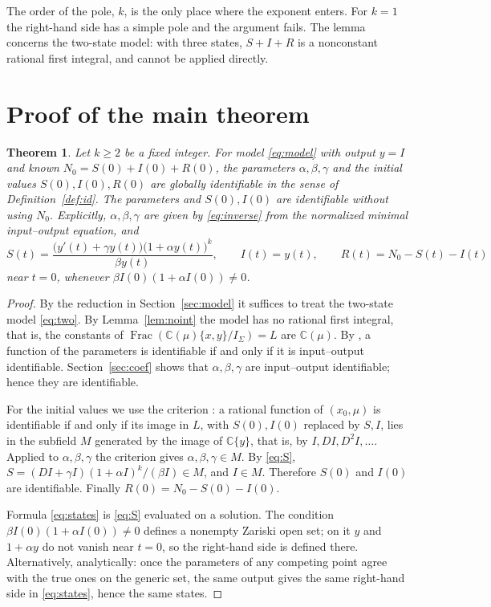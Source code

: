 \documentclass[10pt,a4paper]{article}
\newtheorem{theorem}{Theorem}
\theoremstyle{definition}
\theoremstyle{remark}
\newcommand{\C}{\mathbb C}
\begin{document}
The order of the pole, $k$, is the only place where the exponent enters.
For $k=1$ the right-hand side has a simple pole and the argument fails.
The lemma concerns the two-state model: with three states, $S+I+R$ is a
nonconstant rational first integral, and \cite[Theorem~4.7]{OPT} cannot
be applied directly.

\section{Proof of the main theorem}
\label{sec:proof}
\begin{theorem}
\label{thm:main}
Let $k\geq2$ be a fixed integer. For model \eqref{eq:model} with output
$y=I$ and known $N_0=S(0)+I(0)+R(0)$, the parameters $\alpha,\beta,\gamma$
and the initial values $S(0),I(0),R(0)$ are globally identifiable in the
sense of Definition~\ref{def:id}. The parameters and $S(0),I(0)$ are
identifiable without using $N_0$. Explicitly, $\alpha,\beta,\gamma$ are
given by \eqref{eq:inverse} from the normalized minimal input--output
equation, and
\begin{equation}
 S(t)=\frac{\bigl(y'(t)+\gamma y(t)\bigr)\bigl(1+\alpha y(t)\bigr)^k}
           {\beta y(t)},\qquad I(t)=y(t),\qquad R(t)=N_0-S(t)-I(t)
 \label{eq:states}
\end{equation}
near $t=0$, whenever $\beta I(0)(1+\alpha I(0))\neq0$.
\end{theorem}

\begin{proof}
By the reduction in Section~\ref{sec:model} it suffices to treat the
two-state model \eqref{eq:two}. By Lemma~\ref{lem:noint} the model has no
rational first integral, that is, the constants of
$\operatorname{Frac}(\C(\mu)\{x,y\}/I_\Sigma)=L$ are $\C(\mu)$. By
\cite[Theorem~4.7]{OPT}, a function of the parameters is identifiable if
and only if it is input--output identifiable. Section~\ref{sec:coef}
shows that $\alpha,\beta,\gamma$ are input--output identifiable; hence
they are identifiable.

For the initial values we use the criterion
\cite[Proposition~3.1]{OPT}: a rational function of $(x_0,\mu)$ is
identifiable if and only if its image in $L$, with $S(0),I(0)$ replaced
by $S,I$, lies in the subfield $M$ generated by the image of $\C\{y\}$,
that is, by $I,DI,D^2I,\dots$. Applied to $\alpha,\beta,\gamma$ the
criterion gives $\alpha,\beta,\gamma\in M$. By \eqref{eq:S},
$S=(DI+\gamma I)(1+\alpha I)^k/(\beta I)\in M$, and $I\in M$. Therefore
$S(0)$ and $I(0)$ are identifiable. Finally $R(0)=N_0-S(0)-I(0)$.

Formula \eqref{eq:states} is \eqref{eq:S} evaluated on a solution. The
condition $\beta I(0)(1+\alpha I(0))\neq0$ defines a nonempty Zariski open
set; on it $y$ and $1+\alpha y$ do not vanish near $t=0$, so the right-hand
side is defined there. Alternatively, analytically: once the parameters of any competing
point agree with the true ones on the generic set, the same output gives
the same right-hand side in \eqref{eq:states}, hence the same states.
\end{proof}
\end{document}
